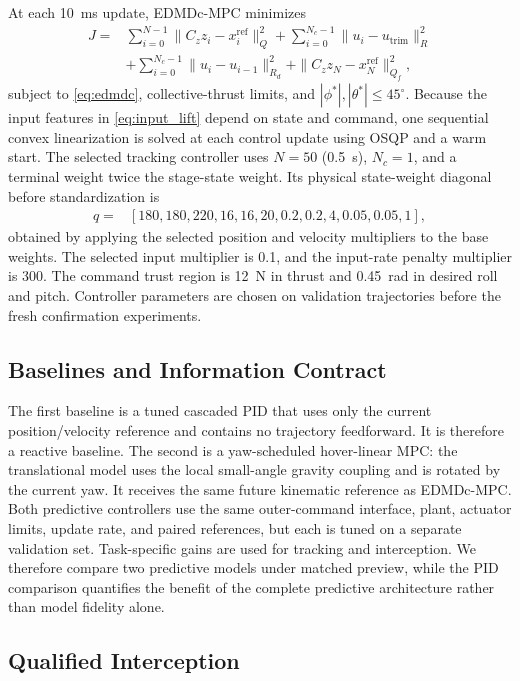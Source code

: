 \documentclass[letterpaper,10pt,conference]{ieeeconf}
\begin{document}
At each 10~ms update, EDMDc-MPC minimizes
\begin{align}
J=&\sum_{i=0}^{N-1}\|C_zz_i-x_i^{\mathrm{ref}}\|_Q^2
+\sum_{i=0}^{N_c-1}\|u_i-u_{\mathrm{trim}}\|_R^2 \nonumber\\
&+\sum_{i=0}^{N_c-1}\|u_i-u_{i-1}\|_{R_d}^2
+\|C_zz_N-x_N^{\mathrm{ref}}\|_{Q_f}^2,
\label{eq:mpc_cost}
\end{align}
subject to \eqref{eq:edmdc}, collective-thrust limits, and
$|\phi^*|,|\theta^*|\le45^\circ$. Because the input features in
\eqref{eq:input_lift} depend on state and command, one sequential convex
linearization is solved at each control update using OSQP and a warm start.
The selected tracking controller uses $N=50$ (0.5~s), $N_c=1$, and a terminal
weight twice the stage-state weight. Its physical state-weight diagonal before
standardization is
\begin{align}
q=&[180,180,220,16,16,20,0.2,0.2,4,0.05,0.05,1],
\end{align}
obtained by applying the selected position and velocity multipliers to the
base weights. The selected input multiplier is 0.1, and the input-rate
penalty multiplier is 300. The command trust region is 12~N in thrust and
0.45~rad in desired roll and pitch. Controller parameters are chosen on
validation trajectories before the fresh confirmation experiments.

\subsection{Baselines and Information Contract}

The first baseline is a tuned cascaded PID that uses only the current
position/velocity reference and contains no trajectory feedforward. It is
therefore a reactive baseline. The second is a yaw-scheduled hover-linear MPC:
the translational model uses the local small-angle gravity coupling and is
rotated by the current yaw. It receives the same future kinematic reference as
EDMDc-MPC. Both predictive controllers use the same outer-command interface,
plant, actuator limits, update rate, and paired references, but each is tuned
on a separate validation set. Task-specific gains are used for tracking and
interception. We therefore compare two predictive models under matched
preview, while the PID comparison quantifies the benefit of the complete
predictive architecture rather than model fidelity alone.

\subsection{Qualified Interception}
\end{document}

